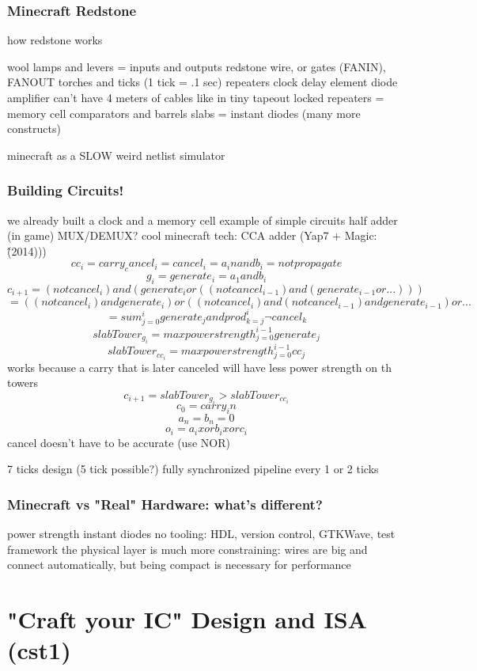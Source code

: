 \documentclass[aspectratio=169]{beamer}
\begin{document}
\begin{frame}
	\frametitle{Minecraft Redstone}
	how redstone works

	wool
	lamps and levers = inputs and outputs
	redstone wire, or gates (FANIN), FANOUT
	torches and ticks (1 tick = .1 sec)
	repeaters
	clock
	delay element
	diode
	amplifier
	can't have 4 meters of cables like in tiny tapeout
	locked repeaters = memory cell
	comparators and barrels
	slabs = instant diodes
	(many more constructs)

	minecraft as a SLOW weird netlist simulator
\end{frame}

\begin{frame}
	\frametitle{Building Circuits!}
	we already built a clock and a memory cell
	example of simple circuits
	half adder (in game)
	MUX/DEMUX?
	cool minecraft tech: CCA adder (Yap7 + Magic:\^ (2014)))
	$$cc_i = carry_cancel_i = cancel_i = a_i nand b_i = not propagate$$
	$$g_i = generate_i = a_1 and b_i$$
	$$c_{i+1} = (not cancel_i) and (generate_i or ((not cancel_{i-1}) and (generate_{i-1} or ...)))$$
	$$= ((not cancel_i) and generate_i) or ((not cancel_i) and (not cancel_{i-1}) and generate_{i-1}) or ...$$
	$$= sum_{j=0}^{i} generate_{j} and prod_{k=j}^{i} ¬cancel_k$$
	$$slabTower_{g_i} = max power strength_{j=0}^{i-1} generate_j$$
	$$slabTower_{cc_i} = max power strength_{j=0}^{i-1} cc_j$$
	works because a carry that is later canceled will have less power strength on th towers
	$$c_{i+1} = slabTower_{g_i} > slabTower_{cc_i}$$
	$$c_0 = carry_in$$
	$$a_n = b_n = 0$$
	$$o_i = a_i xor b_i xor c_i$$
	cancel doesn't have to be accurate (use NOR)

	7 ticks design (5 tick possible?)
	fully synchronized
	pipeline every 1 or 2 ticks
\end{frame}

\begin{frame}
	\frametitle{Minecraft vs "Real" Hardware: what's different?}
	power strength
	instant diodes
	no tooling: HDL, version control, GTKWave, test framework
	the physical layer is much more constraining: wires are big and connect automatically, but being compact is necessary for performance
\end{frame}

\section{"Craft your IC" Design and ISA (cst1)}

\end{document}
